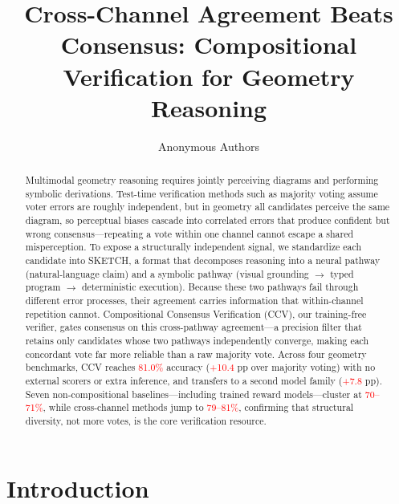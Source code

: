 \documentclass{article}
\title{Cross-Channel Agreement Beats Consensus: Compositional Verification for Geometry Reasoning}
\author{
  Anonymous Authors
}
\newcommand{\recheck}[1]{\textcolor{red}{#1}}
\begin{document}
\maketitle

\begin{abstract}

Multimodal geometry reasoning requires jointly perceiving diagrams and performing symbolic derivations. Test-time verification methods such as majority voting assume voter errors are roughly independent, but in geometry all candidates perceive the same diagram, so perceptual biases cascade into correlated errors that produce confident but wrong consensus---repeating a vote within one channel cannot escape a shared misperception. To expose a structurally independent signal, we standardize each candidate into SKETCH, a format that decomposes reasoning into a neural pathway (natural-language claim) and a symbolic pathway (visual grounding $\rightarrow$ typed program $\rightarrow$ deterministic execution). Because these two pathways fail through different error processes, their agreement carries information that within-channel repetition cannot. Compositional Consensus Verification (CCV), our training-free verifier, gates consensus on this cross-pathway agreement---a precision filter that retains only candidates whose two pathways independently converge, making each concordant vote far more reliable than a raw majority vote. Across four geometry benchmarks, CCV reaches \recheck{81.0\%} accuracy (\recheck{+10.4} pp over majority voting) with no external scorers or extra inference, and transfers to a second model family (\recheck{+7.8} pp). Seven non-compositional baselines---including trained reward models---cluster at \recheck{70--71\%}, while cross-channel methods jump to \recheck{79--81\%}, confirming that structural diversity, not more votes, is the core verification resource.

\end{abstract}

\section{Introduction}
\label{sec:intro}
\end{document}
